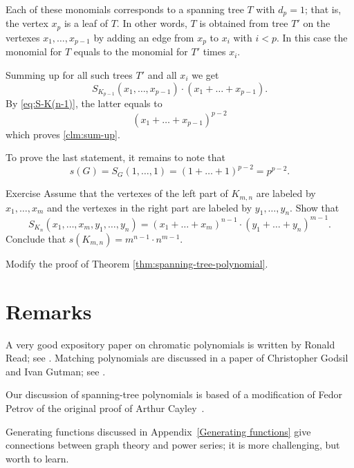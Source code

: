 Each of these monomials corresponds to a spanning tree $T$ with $d_p=1$;
that is, the vertex $x_p$ is a leaf of $T$.
In other words, $T$ is obtained from tree $T'$ on the vertexes $x_1,\dots,x_{p-1}$ 
by adding an edge from $x_p$ to $x_i$ with $i<p$.
In this case the monomial for $T$ equals to the monomial for $T'$ times $x_i$.

Summing up for all such trees $T'$ and all $x_i$ we get 
\[S_{K_{p-1}}(x_1,\dots,x_{p-1})\cdot(x_1+\dots+x_{p-1}).\]
By \ref{eq:S-K(n-1)}, the latter equals to
\[(x_1+\dots+x_{p-1})^{p-2}\]
which proves \ref{clm:sum-up}.

To prove the last statement, it remains to note that 
\[s(G)=S_G(1,\dots,1)=(1+\dots+1)^{p-2}=p^{p-2}.\]
\qedsf

\begin{thm}{Exercise}
Assume that the vertexes of the left part of $K_{m,n}$ are labeled by $x_1,\dots,x_m$ and the vertexes in the right part are labeled by $y_1,\dots,y_n$. 
Show that
\[S_{K_n}(x_1,\dots,x_m,y_1,\dots,y_n)=(x_1+\dots +x_m)^{n-1}\cdot(y_1+\dots +y_n)^{m-1}.\]
Conclude that $s(K_{m,n})=m^{n-1}\cdot n^{m-1}$.

\end{thm}

 Modify the proof of Theorem \ref{thm:spanning-tree-polynomial}.

\section*{Remarks}

A very good expository paper on chromatic polynomials is written by
Ronald Read; see \cite{read}. 
Matching polynomials are discussed in a paper of Christopher Godsil and Ivan Gutman; see \cite{godsil-gutman}.

Our discussion of spanning-tree polynomials is based of a modification of Fedor Petrov \cite{petrov} of the original proof of Arthur Cayley~\cite{cayley}. 

Generating functions discussed in Appendix~\ref{Generating functions} give connections between graph theory and power series; it is more challenging, but worth to learn.   

